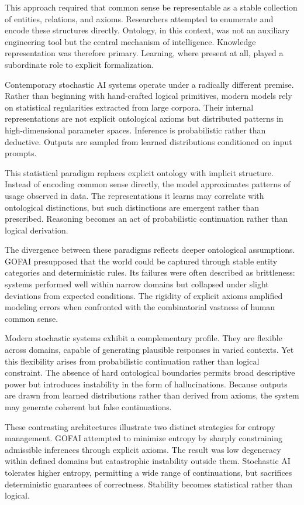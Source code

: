 \documentclass[12pt]{article}
\begin{document}
This approach required that common sense be representable as a stable collection of entities, relations, and axioms. Researchers attempted to enumerate and encode these structures directly. Ontology, in this context, was not an auxiliary engineering tool but the central mechanism of intelligence. Knowledge representation was therefore primary. Learning, where present at all, played a subordinate role to explicit formalization.

Contemporary stochastic AI systems operate under a radically different premise. Rather than beginning with hand-crafted logical primitives, modern models rely on statistical regularities extracted from large corpora. Their internal representations are not explicit ontological axioms but distributed patterns in high-dimensional parameter spaces. Inference is probabilistic rather than deductive. Outputs are sampled from learned distributions conditioned on input prompts.

This statistical paradigm replaces explicit ontology with implicit structure. Instead of encoding common sense directly, the model approximates patterns of usage observed in data. The representations it learns may correlate with ontological distinctions, but such distinctions are emergent rather than prescribed. Reasoning becomes an act of probabilistic continuation rather than logical derivation.

The divergence between these paradigms reflects deeper ontological assumptions. GOFAI presupposed that the world could be captured through stable entity categories and deterministic rules. Its failures were often described as brittleness: systems performed well within narrow domains but collapsed under slight deviations from expected conditions. The rigidity of explicit axioms amplified modeling errors when confronted with the combinatorial vastness of human common sense.

Modern stochastic systems exhibit a complementary profile. They are flexible across domains, capable of generating plausible responses in varied contexts. Yet this flexibility arises from probabilistic continuation rather than logical constraint. The absence of hard ontological boundaries permits broad descriptive power but introduces instability in the form of hallucinations. Because outputs are drawn from learned distributions rather than derived from axioms, the system may generate coherent but false continuations.

These contrasting architectures illustrate two distinct strategies for entropy management. GOFAI attempted to minimize entropy by sharply constraining admissible inferences through explicit axioms. The result was low degeneracy within defined domains but catastrophic instability outside them. Stochastic AI tolerates higher entropy, permitting a wide range of continuations, but sacrifices deterministic guarantees of correctness. Stability becomes statistical rather than logical.
\end{document}
